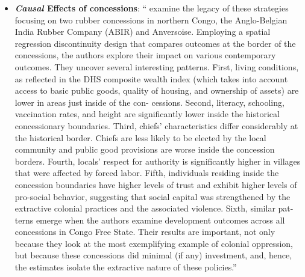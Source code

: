 \documentclass[11pt,a4paper]{article}
\begin{document}
\begin{itemize}
		\item \textbf{\emph{Causal} Effects of concessions}: ``\textcite{Lowes2020} examine the legacy of these strategies focusing on two rubber concessions in northern Congo, the Anglo-Belgian India Rubber Company (ABIR) and Anversoise. Employing a spatial regression discontinuity design that compares outcomes at the border of the concessions, the authors explore their impact on various contemporary outcomes. They uncover several interesting patterns. First, living conditions, as reflected in the DHS composite wealth index (which takes into account access to basic public goods, quality of housing, and ownership of assets) are lower in areas just inside of the con- cessions. Second, literacy, schooling, vaccination rates, and height are significantly lower inside the historical concessionary boundaries. Third, chiefs’ characteristics differ considerably at the historical border. Chiefs are less likely to be elected by the local community and public good provisions are worse inside the concession borders. Fourth, locals’ respect for authority is significantly higher in villages that were affected by forced labor. Fifth, individuals residing inside the concession boundaries have higher levels of trust and exhibit higher levels of pro-social behavior, suggesting that social capital was strengthened by the extractive colonial practices and the associated violence. Sixth, similar pat- terns emerge when the authors examine development outcomes across all concessions in Congo Free State. Their results are important, not only because they look at the most exemplifying example of colonial oppression, but because these concessions did minimal (if any) investment, and, hence, the estimates isolate the extractive nature of these policies.'' \parencite[64]{Michalopoulos2020}
		

\end{itemize}
\end{document}
